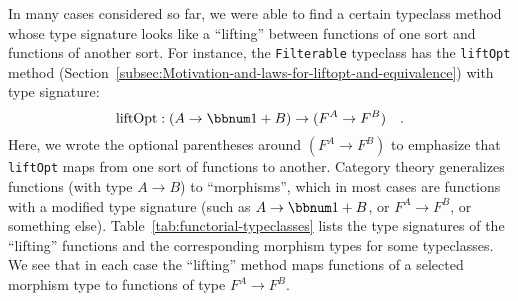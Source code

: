 In many cases considered so far, we were able to find a certain typeclass
method whose type signature looks like a \textsf{``}lifting\textsf{''} between functions
of one sort and functions of another sort. For instance, the \lstinline!Filterable!
typeclass has the \lstinline!liftOpt! method (Section~\ref{subsec:Motivation-and-laws-for-liftopt-and-equivalence})
with type signature:
\[
\text{liftOpt}:\left(A\rightarrow\bbnum 1+B\right)\rightarrow(F^{A}\rightarrow F^{B})\quad.
\]
Here, we wrote the optional parentheses around $(F^{A}\rightarrow F^{B})$
to emphasize that \lstinline!liftOpt! maps from one sort of functions
to another. Category theory generalizes functions (with type $A\rightarrow B$)
to \textsf{``}morphisms\textsf{''}, which in most cases are functions with a modified
type signature (such as $A\rightarrow\bbnum 1+B$, or $F^{A}\rightarrow F^{B}$,
or something else). Table~\ref{tab:functorial-typeclasses} lists
the type signatures of the \textsf{``}lifting\textsf{''} functions and the corresponding
morphism types for some typeclasses. We see that in each case the
\textsf{``}lifting\textsf{''} method maps functions of a selected morphism type to
functions of type $F^{A}\rightarrow F^{B}$.

